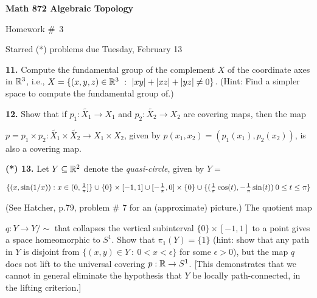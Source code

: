 

\overfullrule=0pt
\parindent=0pt




\loadmsbm

\def\ctln{\centerline}
\def\u{\underbar}
\def\ssk{\smallskip}
\def\msk{\medskip}
\def\bsk{\bigskip}
\def\hsk{\hskip.1in}
\def\hhsk{\hskip.2in}

\def\dsl{\displaystyle}
\def\hskp{\hskip1.5in}
\def\ra{\rightarrow}
\def\lra{$\Leftrightarrow$}
\def\pu{\pi_1}
\def\mpu{$\pi_1$}
\def\bra{$\Rightarrow$}
\def\bbr{{\Bbb R}}
\def\bbz{{\Bbb Z}}
\def\del{\partial}
\def\indt{\item{}}
\def\wtl{\widetilde}



\ctln{\bf Math 872 Algebraic Topology}

\ssk

\ctln{Homework \#\ 3}

\ssk

\ctln{Starred (*) problems due Tuesday, February 13}

\bsk

\item{\bf 11.} Compute the fundamental group of the complement $X$ of the coordinate 
axes in $\bbr^3$, i.e., $X=\{(x,y,z)\in \bbr^3\ :\ |xy|+|xz|+|yz|\neq 0\}$. 
(Hint: Find a simpler space to compute the fundamental group of.)

\msk

\item{\bf 12.} Show that if $p_1:\wtl{X_1}\ra X_1$ and $p_2:\wtl{X_2}\ra X_2$ are
covering maps, then the map 

\ssk

$p=p_1\times p_2:\wtl{X_1}\times\wtl{X_2}\ra X_1\times X_2$,
given by $p(x_1,x_2)=(p_1(x_1),p_2(x_2))$, is also a covering map.


\msk

\item{\bf (*) 13.} Let $Y\subseteq \bbr^2$ denote the {\it quasi-circle}, given by
$Y=$

\ssk

$\{(x,\sin(1/x)):x\in(0,{{1}\over{\pi}}]\}\cup\{0\}\times [-1,1]\cup[-{{1}\over{\pi}},0]\times\{0\}
\cup\{({{1}\over{\pi}}\cos(t),-{{1}\over{\pi}}\sin(t))\:0\leq t\leq \pi\}$

\ssk

(See Hatcher, p.79, problem \# 7 for an (approximate) picture.) The quotient map

$q:Y\ra Y/\sim$ that collapses the vertical subinterval $\{0\}\times [-1,1]$ to a point 
gives a space homeomorphic to $S^1$. 
Show that $\pi_1(Y)=\{1\}$ (hint: show that any path in $Y$ is disjoint from $\{(x,y)\in Y\ :\ 0<x<\epsilon\}$
for some $\epsilon>0$), but the map $q$ does not lift to the universal covering
$p:\bbr\ra S^1$. [This demonstrates that we cannot in general eliminate the hypothesis 
that $Y$ be locally path-connected, in the lifting criterion.]

